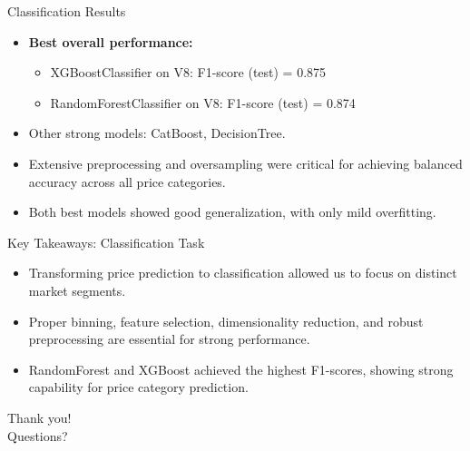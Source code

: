 \documentclass{beamer}
\begin{document}
\begin{frame}{Classification Results}
        \begin{itemize}
                \item \textbf{Best overall performance:}
                        \begin{itemize}
                                \item XGBoostClassifier on V8: F1-score (test)
                                        = 0.875
                                \item RandomForestClassifier on V8: F1-score
                                        (test) = 0.874
                        \end{itemize}
                \item Other strong models: CatBoost, DecisionTree.
                \item Extensive preprocessing and oversampling were critical
                        for achieving balanced accuracy across all price
                        categories.
                \item Both best models showed good generalization, with only
                        mild overfitting.
        \end{itemize}
\end{frame}


\begin{frame}{Key Takeaways: Classification Task}
        \begin{itemize}
                \item Transforming price prediction to classification allowed
                        us to focus on distinct market segments.
                \item Proper binning, feature selection, dimensionality
                        reduction, and robust preprocessing are essential for
                        strong performance.
                \item RandomForest and XGBoost achieved the highest F1-scores,
                        showing strong capability for price category
                        prediction.
        \end{itemize}
\end{frame}

\begin{frame}
        \centering
        \Huge
        Thank you! \\
        Questions?
\end{frame}
\end{document}
